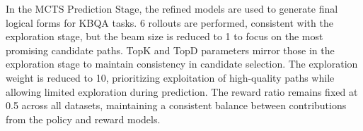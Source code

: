 \documentclass{article}
\theoremstyle{plain}
\theoremstyle{definition}
\theoremstyle{remark}
\begin{document}
In the MCTS Prediction Stage, the refined models are used to generate final logical forms for KBQA tasks. 6 rollouts are performed, consistent with the exploration stage, but the beam size is reduced to 1 to focus on the most promising candidate paths. TopK and TopD parameters mirror those in the exploration stage to maintain consistency in candidate selection. The exploration weight is reduced to 10, prioritizing exploitation of high-quality paths while allowing limited exploration during prediction. The reward ratio remains fixed at 0.5 across all datasets, maintaining a consistent balance between contributions from the policy and reward models.


\begin{table}[h!t]
\centering
\caption{\label{t_para}
HyperParameter Settings for GrailQA, WebQSP, and GraphQ}
\vskip 0.1in
\small
\centering
{}
\end{table}
\end{document}
